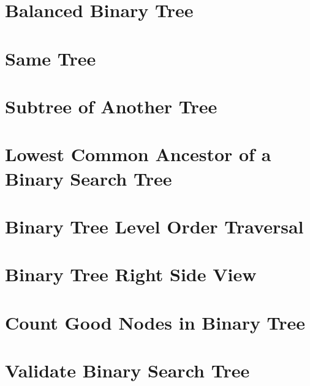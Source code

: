 \documentclass[12pt,letterpaper]{book}
\theoremstyle{definition}
\theoremstyle{remark}
\begin{document}

\section{Balanced Binary Tree}


\section{Same Tree}


\section{Subtree of Another Tree}


\section{Lowest Common Ancestor of a Binary Search Tree}


\section{Binary Tree Level Order Traversal}


\section{Binary Tree Right Side View}


\section{Count Good Nodes in Binary Tree}


\section{Validate Binary Search Tree}
\end{document}
